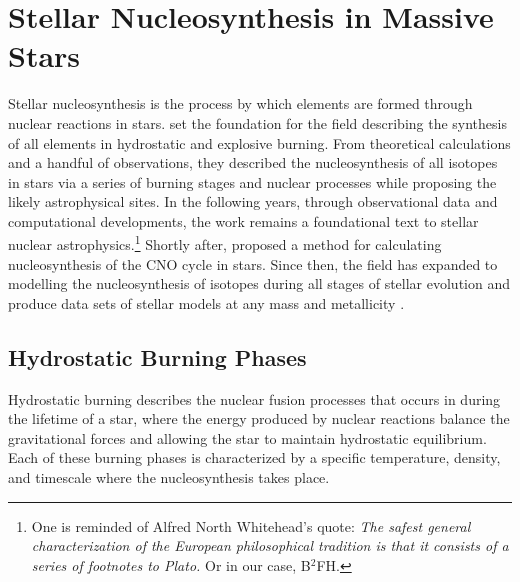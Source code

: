 \section{Stellar Nucleosynthesis in Massive Stars}

Stellar nucleosynthesis is the process by which elements are formed through nuclear reactions in stars.
\cite{burbidgeSynthesisElementsStars1957} set the foundation for the field describing the synthesis of all elements in hydrostatic and explosive burning.
From theoretical calculations and a handful of observations, they described the nucleosynthesis of all isotopes in stars via a series of burning stages and nuclear processes while proposing the likely astrophysical sites.
In the following years, through observational data and computational developments, the work remains a foundational text to stellar nuclear astrophysics.\footnote{One is reminded of Alfred North Whitehead's quote: \textit{The safest general characterization of the European philosophical tradition is that it consists of a series of footnotes to Plato.} Or in our case, B$^2$FH.}
Shortly after, \cite{henyeyNewMethodAutomatic1964} proposed a method for calculating nucleosynthesis of the CNO cycle in stars.
Since then, the field has expanded to modelling the nucleosynthesis of isotopes during all stages of stellar evolution and produce data sets of stellar models at any mass and metallicity \citep{pignatariNuGridStellarData2016, ritterNuGridStellarData2018, battinoNuGridStellarData2019}.

\subsection{Hydrostatic Burning Phases}

Hydrostatic burning describes the nuclear fusion processes that occurs in during the lifetime of a star, where the energy produced by nuclear reactions balance the gravitational forces and allowing the star to maintain hydrostatic equilibrium.
Each of these burning phases is characterized by a specific temperature, density, and timescale where the nucleosynthesis takes place.

